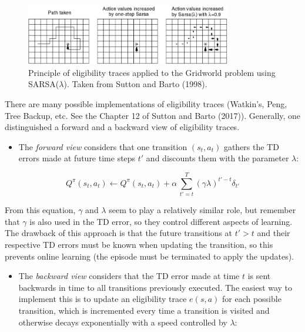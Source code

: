 \documentclass[
  letterpaper,
  DIV=11,
  numbers=noendperiod]{scrreprt}
\providecommand{\tightlist}{%
  \setlength{\itemsep}{0pt}\setlength{\parskip}{0pt}}\usepackage{longtable,booktabs,array}
\begin{document}
\begin{figure}

{\centering \includegraphics[width=0.8\textwidth,height=\textheight]{./img/gridworld-lambda.png}

}

\caption{\label{fig-eligibilitytraces}Principle of eligibility traces
applied to the Gridworld problem using SARSA(\(\lambda\)). Taken from
Sutton and Barto (1998).}

\end{figure}

There are many possible implementations of eligibility traces (Watkin's,
Peng, Tree Backup, etc. See the Chapter 12 of Sutton and Barto (2017)).
Generally, one distinguished a forward and a backward view of
eligibility traces.

\begin{itemize}
\tightlist
\item
  The \emph{forward view} considers that one transition \((s_t, a_t)\)
  gathers the TD errors made at future time steps \(t'\) and discounts
  them with the parameter \(\lambda\):
\end{itemize}

\[
    Q^\pi(s_t, a_t) \leftarrow  Q^\pi(s_t, a_t) + \alpha \, \sum_{t'=t}^T (\gamma \lambda)^{t'-t} \delta_{t'}
\]

From this equation, \(\gamma\) and \(\lambda\) seem to play a relatively
similar role, but remember that \(\gamma\) is also used in the TD error,
so they control different aspects of learning. The drawback of this
approach is that the future transitions at \(t'>t\) and their respective
TD errors must be known when updating the transition, so this prevents
online learning (the episode must be terminated to apply the updates).

\begin{itemize}
\tightlist
\item
  The \emph{backward view} considers that the TD error made at time
  \(t\) is sent backwards in time to all transitions previously
  executed. The easiest way to implement this is to update an
  eligibility trace \(e(s,a)\) for each possible transition, which is
  incremented every time a transition is visited and otherwise decays
  exponentially with a speed controlled by \(\lambda\):
\end{itemize}
\end{document}
